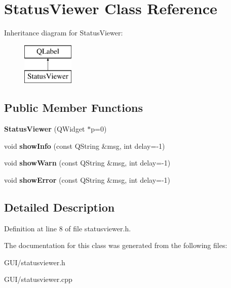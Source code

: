 \hypertarget{class_status_viewer}{}\section{Status\+Viewer Class Reference}
\label{class_status_viewer}
Inheritance diagram for Status\+Viewer\+:\begin{figure}[H]
\begin{center}
\leavevmode
\includegraphics[height=2.000000cm]{class_status_viewer}
\end{center}
\end{figure}
\subsection*{Public Member Functions}
\begin{DoxyCompactItemize}
\item 
\mbox{\label{class_status_viewer_aeec36d48fed6e3fc7ed4a595112ec49f}} 
{\bfseries Status\+Viewer} (Q\+Widget $\ast$p=0)
\item 
\mbox{\label{class_status_viewer_a1457462f7e2403fe27ab90fc5fdc8883}} 
void {\bfseries show\+Info} (const Q\+String \&msg, int delay=-\/1)
\item 
\mbox{\label{class_status_viewer_a881505cc267a01c91ed50f8762f17e65}} 
void {\bfseries show\+Warn} (const Q\+String \&msg, int delay=-\/1)
\item 
\mbox{\label{class_status_viewer_a1d34fcb68a178ab2e007fa27a4e7dd52}} 
void {\bfseries show\+Error} (const Q\+String \&msg, int delay=-\/1)
\end{DoxyCompactItemize}


\subsection{Detailed Description}


Definition at line 8 of file statusviewer.\+h.



The documentation for this class was generated from the following files\+:\begin{DoxyCompactItemize}
\item 
G\+U\+I/statusviewer.\+h\item 
G\+U\+I/statusviewer.\+cpp\end{DoxyCompactItemize}
